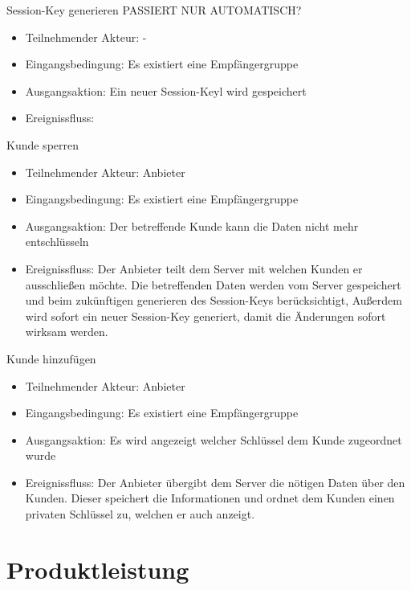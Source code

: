 \documentclass[a4paper,10pt]{scrartcl}
\begin{document}
\begin{usecase}
{\begin{itemize}
   \end{itemize}
}
 {Session-Key generieren PASSIERT NUR AUTOMATISCH?
   \begin{itemize}
   \item Teilnehmender Akteur: -
   \item Eingangsbedingung: Es existiert eine Empfängergruppe
   \item Ausgangsaktion: Ein neuer Session-Keyl wird gespeichert
   \item Ereignissfluss: 
   \end{itemize}
}
 {Kunde sperren
   \begin{itemize}
   \item Teilnehmender Akteur: Anbieter
   \item Eingangsbedingung: Es existiert eine Empfängergruppe
   \item Ausgangsaktion: Der betreffende Kunde kann die Daten nicht mehr entschlüsseln
   \item Ereignissfluss: Der Anbieter teilt dem Server mit welchen Kunden er ausschließen möchte. Die betreffenden Daten werden vom Server gespeichert und
               beim zukünftigen generieren des Session-Keys berücksichtigt, Außerdem wird sofort ein neuer Session-Key generiert, damit die Änderungen sofort wirksam werden.
   \end{itemize}
}
 {Kunde hinzufügen
   \begin{itemize}
   \item Teilnehmender Akteur: Anbieter
   \item Eingangsbedingung: Es existiert eine Empfängergruppe
   \item Ausgangsaktion: Es wird angezeigt welcher Schlüssel dem Kunde zugeordnet wurde
   \item Ereignissfluss: Der Anbieter übergibt dem Server die nötigen Daten über den Kunden. Dieser speichert die Informationen und ordnet dem Kunden 
               einen privaten Schlüssel zu, welchen er auch anzeigt.
   \end{itemize}
}
\end{usecase}

\section{Produktleistung}
\end{document}
